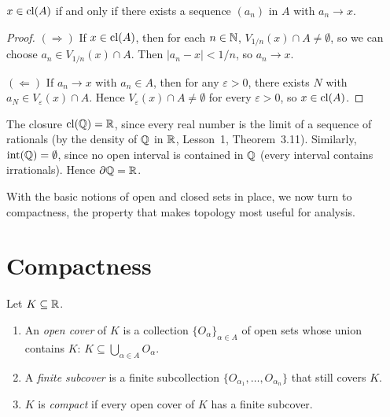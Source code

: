 \documentclass[11pt,a4paper]{article}
\begin{document}
\begin{proposition}
\label{prop:closure_seq}
$x \in \operatorname{cl}(A)$ if and only if there exists a sequence $(a_n)$ in $A$
with $a_n \to x$.
\end{proposition}

\begin{proof}
$(\Rightarrow)$ If $x \in \operatorname{cl}(A)$, then for each $n \in \mathbb{N}$,
$V_{1/n}(x) \cap A \neq \emptyset$, so we can choose
$a_n \in V_{1/n}(x) \cap A$. Then $|a_n - x| < 1/n$, so $a_n \to x$.

$(\Leftarrow)$ If $a_n \to x$ with $a_n \in A$, then for any
$\varepsilon > 0$, there exists $N$ with $a_N \in V_\varepsilon(x) \cap A$.
Hence $V_\varepsilon(x) \cap A \neq \emptyset$ for every $\varepsilon > 0$,
so $x \in \operatorname{cl}(A)$.
\end{proof}

\begin{example}
\label{ex:closure_Q}
The closure $\operatorname{cl}(\mathbb{Q}) = \mathbb{R}$, since every real number is the limit of a
sequence of rationals (by the density of $\mathbb{Q}$ in $\mathbb{R}$, Lesson~1,
Theorem~3.11). Similarly, $\operatorname{int}(\mathbb{Q}) = \emptyset$, since no open
interval is contained in $\mathbb{Q}$ (every interval contains irrationals).
Hence $\partial \mathbb{Q} = \mathbb{R}$.
\end{example}

With the basic notions of open and closed sets in place, we now turn to
compactness, the property that makes topology most useful for analysis.

\section{Compactness}
\label{sec:compactness}

\begin{definition}
\label{def:compact}
Let $K \subseteq \mathbb{R}$.
\begin{enumerate}[nosep,label=(\roman*)]
  \item An \emph{open cover} of $K$ is a collection
    $\{O_\alpha\}_{\alpha \in A}$ of open sets whose union contains $K$:
    $K \subseteq \bigcup_{\alpha \in A} O_\alpha$.
  \item A \emph{finite subcover} is a finite subcollection
    $\{O_{\alpha_1}, \ldots, O_{\alpha_n}\}$ that still covers $K$.
  \item $K$ is \emph{compact} if every open cover of $K$ has a finite
    subcover.
\end{enumerate}
\end{definition}
\end{document}
